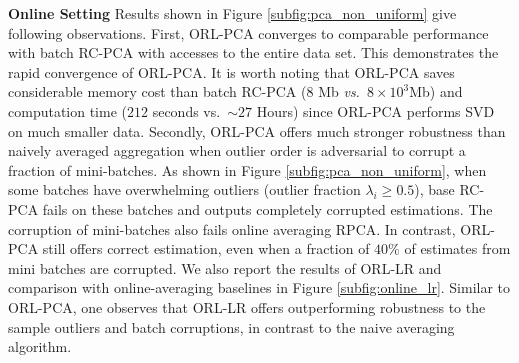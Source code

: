 \documentclass[11pt]{article}
\begin{document}
\textbf{Online Setting} Results shown in Figure \ref{subfig:pca_non_uniform} give following observations. First, ORL-PCA converges to comparable performance with batch RC-PCA with accesses to  the entire data set. This demonstrates the rapid convergence of ORL-PCA. It is worth noting that ORL-PCA saves considerable memory cost than batch RC-PCA ($ 8 $ Mb \emph{vs.}\ $ 8\times 10^3 $Mb) and computation time ($ 212 $ seconds vs.\ $ \sim 27 $ Hours) since ORL-PCA performs SVD on much smaller data. Secondly, ORL-PCA offers much stronger robustness than naively averaged aggregation when outlier order is adversarial to corrupt a fraction of mini-batches. As shown in Figure \ref{subfig:pca_non_uniform}, when some batches have overwhelming outliers (outlier fraction $ \lambda_i \geq 0.5 $), base RC-PCA fails on these batches and outputs completely corrupted estimations. The corruption of mini-batches also fails online averaging RPCA. In contrast, ORL-PCA still offers correct estimation, even when a fraction of  $ 40\% $ of estimates from mini batches are corrupted.
We also report the results of ORL-LR and comparison with online-averaging baselines in Figure \ref{subfig:online_lr}. Similar to ORL-PCA, one observes that ORL-LR offers outperforming robustness to the sample outliers and batch corruptions, in contrast to the naive averaging algorithm.

\end{document}
